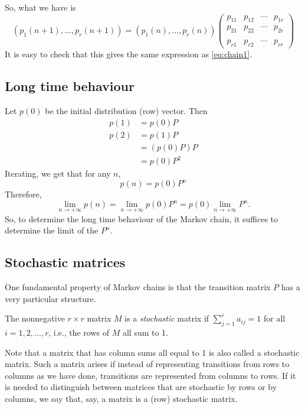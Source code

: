 So, what we have is
\[
(p_1(n+1),\ldots,p_r(n+1))=
(p_1(n),\ldots,p_r(n))
\begin{pmatrix}
p_{11} & p_{12} & \cdots & p_{1r} \\
p_{21} & p_{22} & \cdots & p_{2r} \\
&&& \\
p_{r1} & p_{r2} & \cdots & p_{rr}
\end{pmatrix}
\]
It is easy to check that this gives the same expression as \eqref{eq:chain1}.

\subsection{Long time behaviour}
Let $p(0)$ be the initial distribution (row) vector. Then
\begin{align*}
p(1) &= p(0)P \\
p(2) &= p(1)P\\
&= (p(0)P)P \\
&= p(0)P^2
\end{align*}
Iterating, we get that for any $n$,
\[
p(n)=p(0)P^n
\]
Therefore, 
\begin{equation}\label{eq:limit_Markov_chain}
\lim_{n\rightarrow +\infty}p(n)=\lim_{n\rightarrow +\infty}p(0)P^n=p(0)\lim_{n\rightarrow +\infty}P^n.
\end{equation}
So, to determine the long time behaviour of the Markov chain, it suffices to determine the limit of the $P^n$.


\subsection{Stochastic matrices}
One fundamental property of Markov chains is that the transition matrix $P$ has a very particular structure.
\begin{definition}
The nonnegative $r\times r$ matrix $M$ is a \emph{stochastic} matrix if $\sum_{j=1}^ra_{ij}=1$ for all $i=1,2,\dots, r$, i.e., the rows of $M$ all sum to 1.
\end{definition}
Note that a matrix that has column sums all equal to 1 is also called a stochastic matrix. Such a matrix arises if instead of representing transitions from rows to columns as we have done, transitions are represented from columns to rows. 
If it is needed to distinguish between matrices that are stochastic by rows or by columns, we say that, say, a matrix is a (row) stochastic matrix.

